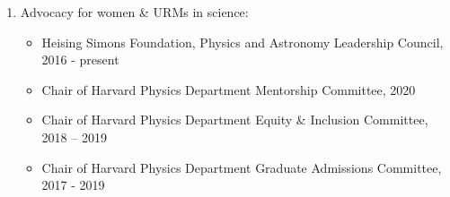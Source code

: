 \begin{enumerate}
\item Advocacy for women \& URMs in science:
\begin{itemize}
    \item Heising Simons Foundation, Physics and Astronomy Leadership Council, 2016 - present
    \item Chair of Harvard Physics Department Mentorship Committee, 2020
    \item Chair of Harvard Physics Department Equity \& Inclusion Committee, 2018 – 2019
    \item Chair of Harvard Physics Department Graduate Admissions Committee, 2017 - 2019
\end{itemize}

\end{enumerate}
